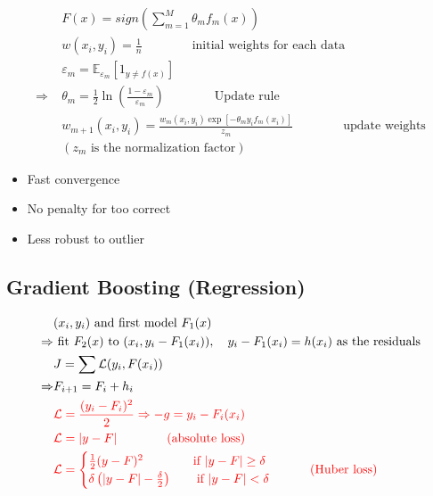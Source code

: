 \begin{align}
	&F(x) = sign \left( \sum_{m=1}^{M} \theta_m f_m(x) \right)\\
	&w(x_i, y_i) = \frac{1}{n} \qquad\qquad \text{initial weights for each data}\\
	&\varepsilon_m = \mathbb{E}_{\varepsilon_m} \left[ 1_{y \neq f(x)} \right]\\
	\Rightarrow\; &\theta_m = \frac{1}{2} \ln\left( \frac{1-\varepsilon_m}{\varepsilon_m} \right) \qquad\qquad \text{Update rule}\\
	&w_{m+1}(x_i, y_i) = \frac{w_m(x_i, y_i) \exp[-\theta_m y_i f_m(x_i)]}{z_m} \qquad\qquad \text{update weights}\\
	&(z_m \text{ is the normalization factor})
\end{align}

\begin{itemize}
	\item Fast convergence
	\item No penalty for too correct
	\item Less robust to outlier
\end{itemize}

\subsection{Gradient Boosting (Regression)}
\begin{align}
	& (x_i, y_i) \text{ and first model } F_1(x)\\
	\Rightarrow & \text{ fit } F_2(x) \text{ to } (x_i, y_i - F_1(x_i)), \quad y_i - F_1(x_i)=h(x_i)	\text{ as the residuals}\\
	& J = \sum \mathcal{L} (y_i, F(x_i))\\
	\Rightarrow & F_{i+1} = F_i + h_i\\
	&{\color{red} \mathcal{L} = \frac{(y_i - F_i)^2}{2} \Rightarrow -g = y_i - F_i(x_i)} \\
	\label{eq:1}
	&{\color{red} \mathcal{L} = |y-F| \qquad \qquad \text{(absolute loss)} }\\
	\label{eq:2}
	&{\color{red} \mathcal{L} =\begin{cases}
			\frac{1}{2} (y-F)^2 \qquad\qquad \text{if } |y-F| \geq \delta\\
			\delta \left( |y-F| - \frac{\delta}{2} \right) \qquad \text{if } |y-F| <\delta
	\end{cases} \qquad \text{(Huber loss)}} 
\end{align}

